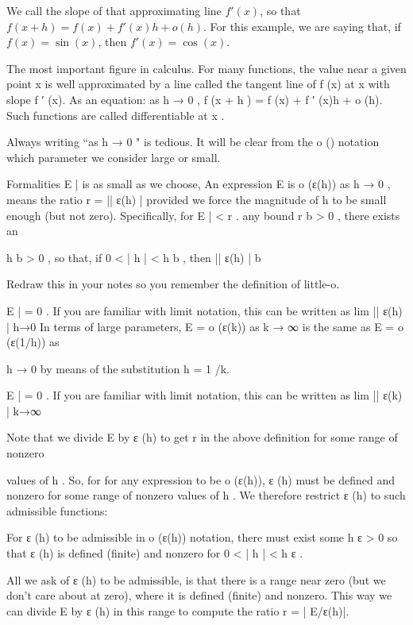 We call the slope of that approximating line  $f'(x)$, so that $f(x+h)=f(x)+f'(x)h+o(h)$.  For this example, we are saying that, if $f(x) = \sin(x)$, then  $f'(x)=\cos(x)$.  
 
The most important figure in calculus.  For many functions, the value near a given point  x is well approximated by a line called the tangent line of  f (x)  at  x with slope  f ′ (x).     As an  
equation: as  h → 0 ,   f (x + h ) = f (x) + f ′ (x)h + o (h).     Such functions are called differentiable at  x .  
 
Always writing “as  h → 0 "  is tedious.  It will be clear from the  o ()  notation which parameter we  
consider large or small. 
 
Formalities
E | is as small as we choose,  
An expression  E    is  o (ε(h))  as  h → 0 , means the ratio  r = || ε(h)
|
provided we force the magnitude of  h to be small enough (but not zero).  Specifically, for  
E | < r .  
any bound   r b > 0 ,  there exists an 
 
h b > 0 ,  so that, if  0 < | h | < h b ,  then  || ε(h)
| b
 
 
 
 
Redraw this in your notes so you remember the definition of little-o. 
 
 
E | = 0 .  
If you are familiar with limit notation, this can be written as  lim || ε(h)
|
h→0
 In terms of large parameters,  E = o (ε(k))    as  k → ∞   is the same as  E = o (ε(1/h))  as
   
h → 0 by means of the substitution  h = 1 /k.  
 
E | = 0 .  
If you are familiar with limit notation, this can be written as  lim || ε(k)
|
k→∞
 
Note that we divide  E  by 
  ε (h)  to get  r  in the above definition for some range of nonzero
 
 
values of  h .    So, for for any expression to be  o (ε(h)),   ε (h)  must be defined and nonzero  
for some range of nonzero values of  h .    We therefore restrict  ε (h)  to such admissible  
functions:   
 
For  ε (h)  to be admissible in  o (ε(h))  notation, there must exist some  h ε > 0  so  
that  ε (h)  is defined (finite) and nonzero for  0 < | h | < h ε .     
 
 
All we ask of  ε (h)  to be admissible, is that there is a range near zero (but we don’t  
care about at zero), where it is defined (finite) and nonzero.  This way we can 
divide  E    by  ε (h)  in this range to compute the ratio  r = | E/ε(h)|.  
 
